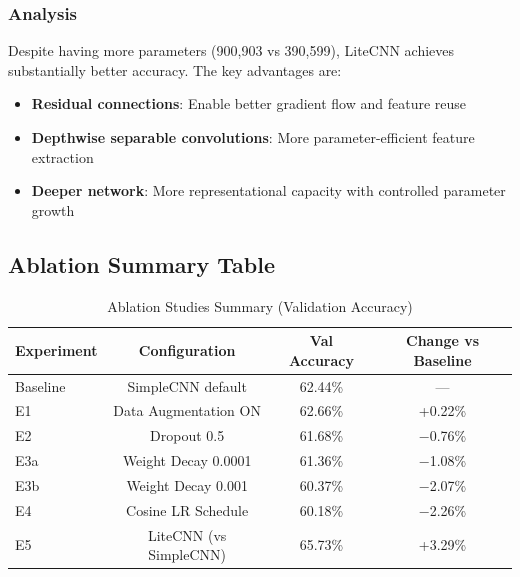 \documentclass[12pt,a4paper]{article}
\begin{document}
\subsubsection{Analysis}
Despite having more parameters (900,903 vs 390,599), LiteCNN achieves substantially better accuracy. The key advantages are:
\begin{itemize}[leftmargin=*]
    \item \textbf{Residual connections}: Enable better gradient flow and feature reuse
    \item \textbf{Depthwise separable convolutions}: More parameter-efficient feature extraction
    \item \textbf{Deeper network}: More representational capacity with controlled parameter growth
\end{itemize}



\subsection{Ablation Summary Table}

\begin{table}[h!]
\centering
\caption{Ablation Studies Summary (Validation Accuracy)}
\label{tab:ablation_summary}
\small
\renewcommand{\arraystretch}{1.3}
\begin{tabular}{|l|c|c|c|}
\hline
\textbf{Experiment} & \textbf{Configuration} & \textbf{Val Accuracy} & \textbf{Change vs Baseline} \\
\hline
Baseline & SimpleCNN default & 62.44\% & --- \\
\hline
E1 & Data Augmentation ON & 62.66\% & \cellcolor[HTML]{E8F5E9} +0.22\% \\
\hline
E2 & Dropout 0.5 & 61.68\% & \cellcolor[HTML]{FFEBEE} $-$0.76\% \\
\hline
E3a & Weight Decay 0.0001 & 61.36\% & \cellcolor[HTML]{FFEBEE} $-$1.08\% \\
\hline
E3b & Weight Decay 0.001 & 60.37\% & \cellcolor[HTML]{FFCDD2} $-$2.07\% \\
\hline
E4 & Cosine LR Schedule & 60.18\% & \cellcolor[HTML]{FFCDD2} $-$2.26\% \\
\hline
E5 & LiteCNN (vs SimpleCNN) & 65.73\% & \cellcolor[HTML]{C8E6C9} +3.29\% \\
\hline
\end{tabular}
\end{table}
\end{document}

